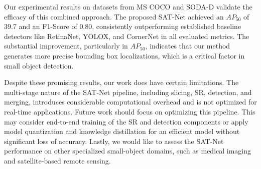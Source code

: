\documentclass[12pt, a4paper]{article}
\begin{document}
Our experimental results on datasets from MS COCO and SODA-D validate the efficacy of this combined approach. The proposed SAT-Net achieved an $AP_{50}$ of $39.7$ and an F1-Score of $0.80$, consistently outperforming established baseline detectors like RetinaNet, YOLOX, and CornerNet in all evaluated metrics. The substantial improvement, particularly in $AP_{50}$, indicates that our method generates more precise bounding box localizations, which is a critical factor in small object detection.

Despite these promising results, our work does have certain limitations. The multi-stage nature of the SAT-Net pipeline, including slicing, SR, detection, and merging, introduces considerable computational overhead and is not optimized for real-time applications. Future work should focus on optimizing this pipeline. This may consider end-to-end training of the SR and detection components or apply model quantization and knowledge distillation for an efficient model without significant loss of accuracy. Lastly, we would like to assess the SAT-Net performance on other specialized small-object domains, such as medical imaging and satellite-based remote sensing.

\printbibliography[title={References}]
\end{document}
